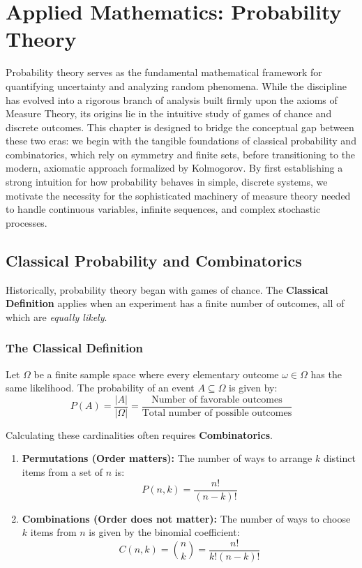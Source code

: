 \documentclass[oneside]{book}
\begin{document}
\chapter{Applied Mathematics: Probability Theory}

Probability theory serves as the fundamental mathematical framework for quantifying uncertainty and analyzing random phenomena. While the discipline has evolved into a rigorous branch of analysis built firmly upon the axioms of Measure Theory, its origins lie in the intuitive study of games of chance and discrete outcomes. This chapter is designed to bridge the conceptual gap between these two eras: we begin with the tangible foundations of classical probability and combinatorics, which rely on symmetry and finite sets, before transitioning to the modern, axiomatic approach formalized by Kolmogorov. By first establishing a strong intuition for how probability behaves in simple, discrete systems, we motivate the necessity for the sophisticated machinery of measure theory needed to handle continuous variables, infinite sequences, and complex stochastic processes.

\section{Classical Probability and Combinatorics}

Historically, probability theory began with games of chance. The \textbf{Classical Definition} applies when an experiment has a finite number of outcomes, all of which are \textit{equally likely}.

\subsection{The Classical Definition}

\begin{definition}
Let $\Omega$ be a finite sample space where every elementary outcome $\omega \in \Omega$ has the same likelihood. The probability of an event $A \subseteq \Omega$ is given by:
\[ P(A) = \frac{|A|}{|\Omega|} = \frac{\text{Number of favorable outcomes}}{\text{Total number of possible outcomes}} \]
\end{definition}

Calculating these cardinalities often requires \textbf{Combinatorics}.

\newpage

\begin{theorem}
\begin{enumerate}
    \item \textbf{Permutations (Order matters):} The number of ways to arrange $k$ distinct items from a set of $n$ is:
    \[ P(n, k) = \frac{n!}{(n-k)!} \]
    \item \textbf{Combinations (Order does not matter):} The number of ways to choose $k$ items from $n$ is given by the binomial coefficient:
    \[ C(n, k) = \binom{n}{k} = \frac{n!}{k!(n-k)!} \]
\end{enumerate}
\end{theorem}
\end{document}
